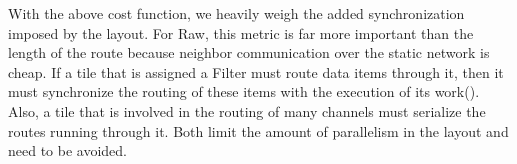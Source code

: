 With the above cost function, we heavily weigh the added
synchronization imposed by the layout.  For Raw, this metric is far
more important than the length of the route because neighbor
communication over the static network is cheap.  If a tile that is
assigned a Filter must route data items through it, then it must
synchronize the routing of these items with the execution of its
work().  Also, a tile that is involved in the routing of many channels
must serialize the routes running through it.  Both limit the amount
of parallelism in the layout and need to be avoided.

